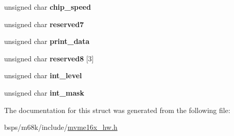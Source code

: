 \begin{DoxyCompactItemize}
unsigned char {\bfseries chip\+\_\+speed}
\item 
\mbox{\label{structpccchip2__regs___a409d8eb739e083669b6e1cce84f368e0}} 
unsigned char {\bfseries reserved7}
\item 
\mbox{\label{structpccchip2__regs___a922a385d10c2aa73ee1fcd9cf2d207da}} 
unsigned char {\bfseries print\+\_\+data}
\item 
\mbox{\label{structpccchip2__regs___aaea2222ea19662dedd53327fc7c215b1}} 
unsigned char {\bfseries reserved8} \mbox{[}3\mbox{]}
\item 
\mbox{\label{structpccchip2__regs___a0dfb8626ef20d2fc42f60b24aba6863d}} 
unsigned char {\bfseries int\+\_\+level}
\item 
\mbox{\label{structpccchip2__regs___ab30e69b76c4b06e80b2e18afe20bbe07}} 
unsigned char {\bfseries int\+\_\+mask}
\end{DoxyCompactItemize}


The documentation for this struct was generated from the following file\+:\begin{DoxyCompactItemize}
\item 
bsps/m68k/include/\mbox{\hyperlink{mvme16x__hw_8h}{mvme16x\+\_\+hw.\+h}}\end{DoxyCompactItemize}
